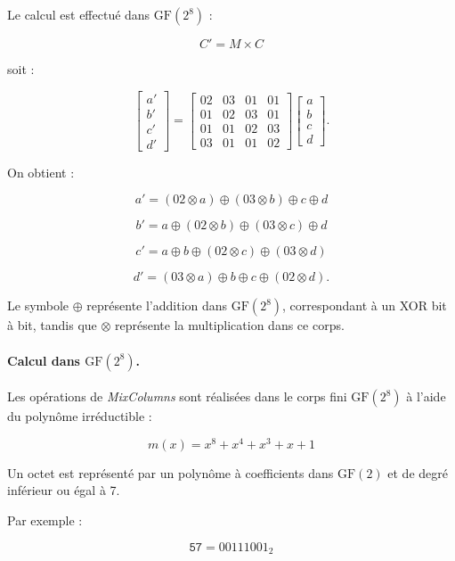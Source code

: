 \documentclass[12pt,a4paper]{article}
\begin{document}
Le calcul est effectué dans $\mathrm{GF}(2^8)$ :

\[
\boxed{
C'=M\times C
}
\]

soit :

\[
\begin{bmatrix}
a'\\
b'\\
c'\\
d'
\end{bmatrix}
=
\begin{bmatrix}
02&03&01&01\\
01&02&03&01\\
01&01&02&03\\
03&01&01&02
\end{bmatrix}
\begin{bmatrix}
a\\
b\\
c\\
d
\end{bmatrix}.
\]

On obtient :

\[
a'=(02\otimes a)
\oplus(03\otimes b)
\oplus c
\oplus d
\]

\[
b'=a
\oplus(02\otimes b)
\oplus(03\otimes c)
\oplus d
\]

\[
c'=a
\oplus b
\oplus(02\otimes c)
\oplus(03\otimes d)
\]

\[
d'=(03\otimes a)
\oplus b
\oplus c
\oplus(02\otimes d).
\]

Le symbole $\oplus$ représente l'addition dans
$\mathrm{GF}(2^8)$, correspondant à un XOR bit à bit, tandis que
$\otimes$ représente la multiplication dans ce corps.



\paragraph{Calcul dans $\mathrm{GF}(2^8)$.}

Les opérations de \textit{MixColumns} sont réalisées dans le corps
fini $\mathrm{GF}(2^8)$ à l'aide du polynôme irréductible :

\[
\boxed{
m(x)=x^8+x^4+x^3+x+1
}
\]

Un octet est représenté par un polynôme à coefficients dans
$\mathrm{GF}(2)$ et de degré inférieur ou égal à 7.

Par exemple :

\[
\texttt{57}=00111001_2
\]
\end{document}

